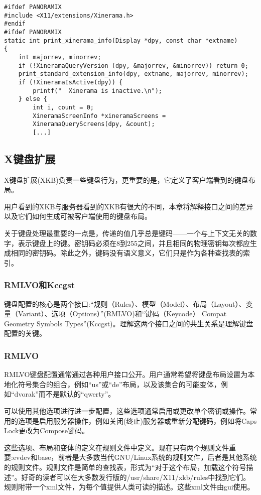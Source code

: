 \begin{lstlisting}
#ifdef PANORAMIX
#include <X11/extensions/Xinerama.h>
#endif
#ifdef PANORAMIX
static int print_xinerama_info(Display *dpy, const char *extname)
{
	int majorrev, minorrev;
	if (!XineramaQueryVersion (dpy, &majorrev, &minorrev)) return 0;
	print_standard_extension_info(dpy, extname, majorrev, minorrev);
	if (!XineramaIsActive(dpy)) {
		printf("  Xinerama is inactive.\n");
	} else {
		int i, count = 0;
		XineramaScreenInfo *xineramaScreens = 
		XineramaQueryScreens(dpy, &count);
		[...]
\end{lstlisting}

\subsection{X键盘扩展}

X键盘扩展(XKB)负责一些键盘行为，更重要的是，它定义了客户端看到的键盘布局。

用户看到的XKB与服务器看到的XKB有很大的不同，本章将解释接口之间的差异以及它们如何生成可被客户端使用的键盘布局。

关于键盘处理最重要的一点是，传递的值几乎总是键码——一个与上下文无关的数字，表示键盘上的键。密钥码必须在8到255之间，并且相同的物理密钥每次都应生成相同的密钥码。除此之外，键码没有语义意义，它们只是作为各种查找表的索引。

\subsubsection{RMLVO和Kccgst}

键盘配置的核心是两个接口:“规则（Rules）、模型（Model）、布局（Layout）、变量（Variant）、选项（Options）”(RMLVO)和“键码（Keycode） Compat Geometry Symbols Types”(Kccgst)。理解这两个接口之间的共生关系是理解键盘配置的关键。

\subsubsection{RMLVO}

RMLVO键盘配置通常通过各种用户接口公开。用户通常希望将键盘布局设置为本地化符号集合的组合，例如“us”或“de”布局，以及该集合的可能变体，例如“dvorak”而不是默认的“qwerty”。

可以使用其他选项进行进一步配置，这些选项通常启用或更改单个密钥或操作。常用的选项是启用服务器操作，例如关闭(终止)服务器或重新分配键码，例如将Caps Lock更改为Compose键码。

这些选项、布局和变体的定义在规则文件中定义。现在只有两个规则文件重要:evdev和base，前者是大多数当代GNU/Linux系统的规则文件，后者是其他系统的规则文件。规则文件是简单的查找表，形式为“对于这个布局，加载这个符号描述”。好奇的读者可以在大多数发行版的/usr/share/X11/xkb/rules中找到它们。规则附带一个xml文件，为每个值提供人类可读的描述。这些xml文件由gui使用。

